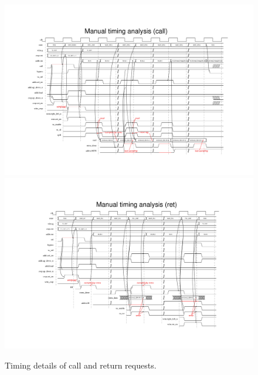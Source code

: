 \begin{figure}
    \vspace*{-2.5\baselineskip}
    \begin{adjustwidth}{-1cm}{-1cm}
    \centering
    \includegraphics[width=\linewidth]{fig/windowed_rf/call_timing.pdf} \\
    \includegraphics[width=\linewidth]{fig/windowed_rf/ret_timing.pdf}
    \caption{Timing details of call and return requests.}
    \label{fig:wrf_timing}
    \end{adjustwidth}
\end{figure}

